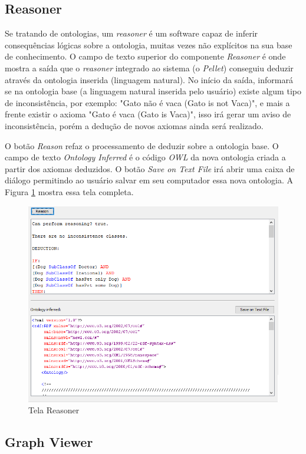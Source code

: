 \documentclass{bcc}
\begin{document}
\subsection{Reasoner}

Se tratando de ontologias, um \textit{reasoner} é um software capaz de inferir consequências lógicas sobre a ontologia, muitas vezes não explícitos na sua base de conhecimento. O campo de texto superior do componente \textit{Reasoner} é onde mostra a saída que o \textit{reasoner} integrado ao sistema (o \textit{Pellet}) conseguiu deduzir através da ontologia inserida (linguagem natural). No início da saída, informará se na ontologia base (a linguagem natural inserida pelo usuário) existe algum tipo de inconsistência, por exemplo: "Gato não é vaca (Gato is not Vaca)", e mais a frente existir o axioma "Gato é vaca (Gato is Vaca)", isso irá gerar um aviso de inconsistência, porém a dedução de novos axiomas ainda será realizado.


O botão \textit{Reason} refaz o processamento de deduzir sobre a ontologia base. O campo de texto \textit{Ontology Inferred} é o código \textit{OWL} da nova ontologia criada a partir dos axiomas deduzidos. O botão \textit{Save on Text File} irá abrir uma caixa de diálogo permitindo ao usuário salvar em seu computador essa nova ontologia. A Figura \ref{fig:telaReasoner} mostra essa tela completa.

\begin{figure}[H]
\centering
\includegraphics[width=.7\textwidth]{Figuras/tela_reasoner.png}
\caption{Tela Reasoner}
\label{fig:telaReasoner}
\end{figure}

\subsection{Graph Viewer}
\end{document}
